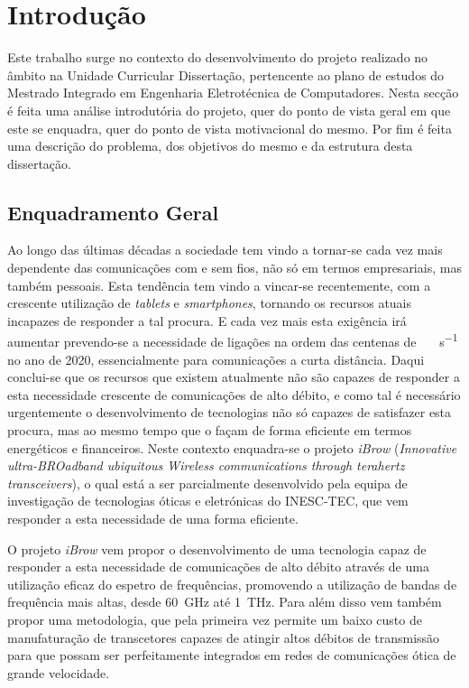\chapter{Introdução} \label{chap:intro}

Este trabalho surge no contexto do desenvolvimento do projeto realizado no âmbito na Unidade Curricular Dissertação, pertencente ao plano de estudos do Mestrado Integrado em Engenharia Eletrotécnica de Computadores. Nesta secção é feita uma análise introdutória do projeto, quer do ponto de vista geral em que este se enquadra, quer do ponto de vista motivacional do mesmo. Por fim é feita uma descrição do problema, dos objetivos do mesmo e da estrutura desta dissertação. 


\section{Enquadramento Geral} \label{sec:context}
Ao longo das últimas décadas a sociedade tem vindo a tornar-se cada vez mais dependente das comunicações com e sem fios, não só em termos empresariais, mas também pessoais. Esta tendência tem vindo a vincar-se recentemente, com a crescente utilização de \textit{tablets} e \textit{smartphones}, tornando os recursos atuais incapazes de responder a tal procura. E cada vez mais esta exigência irá aumentar prevendo-se a necessidade de ligações na ordem das centenas de \SI{}{\giga\bit\per\second} no ano de 2020, essencialmente para comunicações a curta distância. Daqui conclui-se que os recursos que existem atualmente não são capazes de responder a esta necessidade crescente de comunicações de alto débito, e como tal é necessário urgentemente o desenvolvimento de tecnologias não só capazes de satisfazer esta procura, mas ao mesmo tempo que o façam de forma eficiente em termos energéticos e financeiros. Neste contexto enquadra-se o projeto \textit{iBrow} (\textit{Innovative ultra-BROadband ubiquitous Wireless communications through terahertz transceivers}), o qual está a ser parcialmente desenvolvido pela equipa de investigação de tecnologias óticas e eletrónicas do INESC-TEC, que vem responder a esta necessidade de uma forma eficiente.

O projeto \textit{iBrow} vem propor o desenvolvimento de uma tecnologia capaz de responder a esta necessidade de comunicações de alto débito através de uma utilização eficaz do espetro de frequências, promovendo a utilização de bandas de frequência mais altas, desde \SI{60}{\giga\hertz}  até \SI{1}{\tera\hertz}. Para além disso vem também propor uma metodologia, que pela primeira vez permite um baixo custo de manufaturação de transcetores capazes de atingir altos débitos de transmissão para que possam ser perfeitamente integrados em redes de comunicações ótica de grande velocidade.
 
